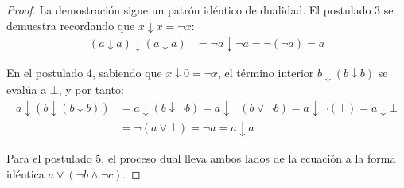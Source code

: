 \begin{proof}
La demostración sigue un patrón idéntico de dualidad. El postulado 3 se demuestra recordando que $x \downarrow x = \neg x$:
\begin{align*}
(a \downarrow a) \downarrow (a \downarrow a) &= \neg a \downarrow \neg a = \neg (\neg a) = a
\end{align*}

En el postulado 4, sabiendo que $x \downarrow 0 = \neg x$, el término interior $b \downarrow (b \downarrow b)$ se evalúa a $\bot$, y por tanto:
\begin{align*}
a \downarrow (b \downarrow (b \downarrow b)) &= a \downarrow (b \downarrow \neg b) = a \downarrow \neg (b \vee \neg b) = a \downarrow \neg (\top) = a \downarrow \bot \\
&= \neg (a \vee \bot) = \neg a = a \downarrow a
\end{align*}

Para el postulado 5, el proceso dual lleva ambos lados de la ecuación a la forma idéntica $a \vee (\neg b \wedge \neg c)$.
\end{proof}

